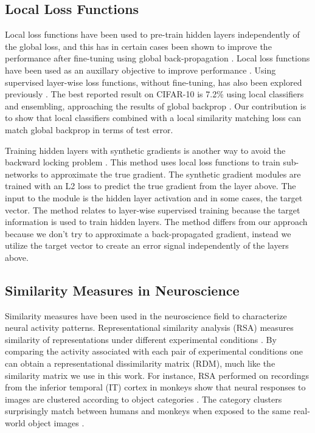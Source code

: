 \documentclass{article}
\begin{document}
\subsection{Local Loss Functions}

Local loss functions have been used to pre-train hidden layers independently of the global loss, and this has in certain cases been shown to improve the performance after fine-tuning using global back-propagation \cite{HintonOT06,Bengio07,SalakhutdinovH09,ErhanBCMVB10,VincentLBM08,PaineKHH14,DongGMYS18}. Local loss functions have been used as an auxillary objective to improve performance \cite{LeeXGZT15,ZhangLL16,SzegedyLJSRAEVR15,WangLTL15a,WestonRMC12}. Using supervised layer-wise loss functions, without fine-tuning, has also been explored previously \cite{Mostafa17,MalachS18,MarquezHN18}. The best reported result on CIFAR-10 is 7.2\% using local classifiers and ensembling, approaching the results of global backprop \cite{BelilovskyEO18}. Our contribution is to show that local classifiers combined with a local similarity matching loss can match global backprop in terms of test error.

Training hidden layers with synthetic gradients is another way to avoid the backward locking problem \cite{JaderbergCOVGSK17}. This method uses local loss functions to train sub-networks to approximate the true gradient. The synthetic gradient modules are trained with an L2 loss to predict the true gradient from the layer above. The input to the module is the hidden layer activation and in some cases, the target vector. The method relates to layer-wise supervised training because the target information is used to train hidden layers. The method differs from our approach because we don't try to approximate a back-propagated gradient, instead we utilize the target vector to create an error signal independently of the layers above.

\subsection{Similarity Measures in Neuroscience}

Similarity measures have been used in the neuroscience field to characterize neural activity patterns. Representational similarity analysis (RSA) measures similarity of representations under different experimental conditions \cite{KriegeskorteMB08}. By comparing the activity associated with each pair of experimental conditions one can obtain a representational dissimilarity matrix (RDM), much like the similarity matrix we use in this work. For instance, RSA performed on recordings from the inferior temporal (IT) cortex in monkeys show that neural responses to images are clustered according to object categories \cite{Kiani07}. The category clusters surprisingly match between humans and monkeys when exposed to the same real-world object images \cite{KriegeskorteMRKBETB08}.
\end{document}
